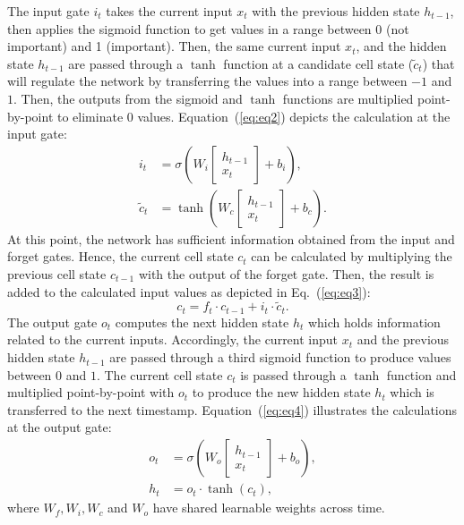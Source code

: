 The input gate \(i_{t}\) takes the current input \(x_t\) with the previous hidden state \(h_{t-1}\), then applies the sigmoid function to get values in a range between 0 (not important) and 1 (important).
Then, the same current input \(x_t\), and the hidden state \(h_{t-1}\) are passed through a \(\tanh\) function at a candidate cell state (\(\tilde{c}_{t}\)) that will regulate the network by transferring the values into a range between \(-1\) and \(1\).
Then, the outputs from the sigmoid and \(\tanh\) functions are multiplied point-by-point to eliminate \(0\) values.  
Equation~(\ref{eq:eq2}) depicts the calculation at the input gate:
\begin{equation}
	\begin{aligned}
		i_{t} &=\sigma\left(W_{i} 
		\left[
		\begin{array}{c}
			h_{t-1} \\ x_{t}
		\end{array} 
		\right]+b_{i}\right), 
		\\
		\tilde{c}_{t} &=\tanh \left(W_{c} 
		\left[
		\begin{array}{c}
			h_{t-1} \\ x_{t}
		\end{array} 
		\right]+b_{c}\right). 
	\end{aligned} \label{eq:eq2}
\end{equation}
At this point, the network has sufficient information obtained from the input and forget gates. 
Hence, the current cell state \(c_{t}\) can be calculated by multiplying the previous cell state \(c_{t-1}\) with the output of the forget gate. 
Then, the result is added to the calculated input values as depicted in Eq.~(\ref{eq:eq3}):
\begin{equation}
	c_{t}=f_{t} \cdot c_{t-1}+i_{t} \cdot \tilde{c}_{t}.
	\label{eq:eq3}
\end{equation}
The output gate \(o_{t}\) computes the next hidden state \(h_{t}\) which
holds information related to the current inputs. 
Accordingly, the current input \(x_{t}\) and the previous hidden state \(h_{t-1}\) are passed through a third sigmoid function to produce values between \(0\) and \(1\).
The current cell state \(c_{t}\) is passed through a \(\tanh\) function and multiplied point-by-point with \(o_{t}\) to produce the new hidden state \(h_{t}\) which is transferred to the next timestamp.
Equation~(\ref{eq:eq4}) illustrates the calculations at the output gate:
\begin{equation}
	\begin{aligned}
		o_{t} &=\sigma\left(W_{o} 
		\left[
		\begin{array}{c}
			h_{t-1} \\ x_{t}
		\end{array} 
		\right]
		+b_{o}\right), \\
		h_{t} &=o_{t} \cdot \tanh \left(c_{t}\right),
	\end{aligned}
	\label{eq:eq4}
\end{equation} 
where \(W_{f}, W_{i}, W_{c}\) and \(W_{o}\) have shared learnable weights across time.

